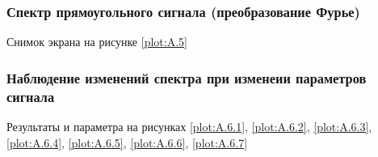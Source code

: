\documentclass[a4paper, 12pt]{article}
\begin{document}
            \subsubsection{Спектр прямоугольного сигнала (преобразование Фурье)}

                Снимок экрана на рисунке \ref{plot:A.5}

            \subsubsection{Наблюдение изменений спектра при изменеии параметров сигнала}

                Результаты и параметра на рисунках \ref{plot:A.6.1}, \ref{plot:A.6.2}, \ref{plot:A.6.3}, \ref{plot:A.6.4}, \ref{plot:A.6.5}, \ref{plot:A.6.6}, \ref{plot:A.6.7}
\end{document}
